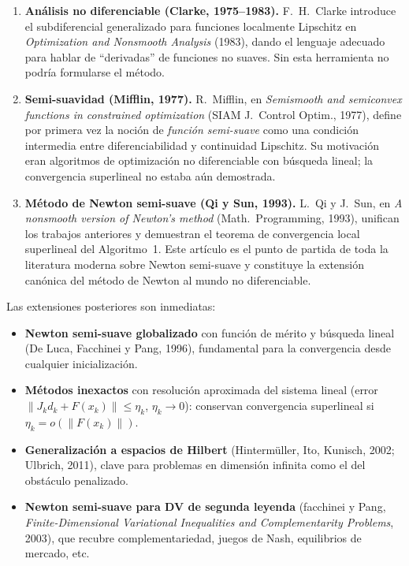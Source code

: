 \documentclass[12pt]{book}
\theoremstyle{definition}
\theoremstyle{plain}
\theoremstyle{remark}
\begin{document}
\begin{enumerate}[leftmargin=1.4em,itemsep=3pt]
  \item \textbf{Análisis no diferenciable (Clarke, 1975--1983).}
    F.~H.~Clarke introduce el subdiferencial generalizado para
    funciones localmente Lipschitz en \textit{Optimization and
    Nonsmooth Analysis} (1983), dando el lenguaje adecuado para
    hablar de ``derivadas'' de funciones no suaves.  Sin esta
    herramienta no podría formularse el método.

  \item \textbf{Semi-suavidad (Mifflin, 1977).}  R.~Mifflin, en
    \textit{Semismooth and semiconvex functions in constrained
    optimization} (SIAM J.\ Control Optim., 1977), define por
    primera vez la noción de \emph{función semi-suave} como una
    condición intermedia entre diferenciabilidad y continuidad
    Lipschitz.  Su motivación eran algoritmos de optimización no
    diferenciable con búsqueda lineal; la convergencia
    superlineal no estaba aún demostrada.

  \item \textbf{Método de Newton semi-suave (Qi y Sun, 1993).}
    L.~Qi y J.~Sun, en \textit{A nonsmooth version of Newton's
    method} (Math.\ Programming, 1993), unifican los trabajos
    anteriores y demuestran el teorema de convergencia local
    superlineal del Algoritmo~1.  Este artículo es el punto de
    partida de toda la literatura moderna sobre Newton
    semi-suave y constituye la extensión canónica del método de
    Newton al mundo no diferenciable.
\end{enumerate}

Las extensiones posteriores son inmediatas:
\begin{itemize}[leftmargin=1.4em,itemsep=2pt]
  \item \textbf{Newton semi-suave globalizado} con función de
        mérito y búsqueda lineal (De Luca, Facchinei y Pang, 1996),
        fundamental para la convergencia desde cualquier
        inicialización.
  \item \textbf{Métodos inexactos} con resolución aproximada del
        sistema lineal (error $\|J_kd_k+F(x_k)\|\le\eta_k$,
        $\eta_k\to0$): conservan convergencia superlineal si
        $\eta_k=o(\|F(x_k)\|)$.
  \item \textbf{Generalización a espacios de Hilbert}
        (Hintermüller, Ito, Kunisch, 2002; Ulbrich, 2011), clave
        para problemas en dimensión infinita como el del
        obstáculo penalizado.
  \item \textbf{Newton semi-suave para DV de segunda leyenda}
        (facchinei y Pang, \textit{Finite-Dimensional Variational
        Inequalities and Complementarity Problems}, 2003), que
        recubre complementariedad, juegos de Nash, equilibrios
        de mercado, etc.
\end{itemize}
\end{document}
